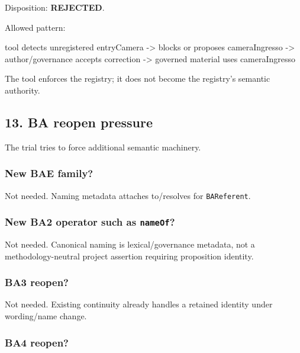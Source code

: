 \documentclass[
  10pt,
  a4paper,
]{article}
\newenvironment{Shaded}{}{}
\newcommand{\NormalTok}[1]{#1}
\begin{document}
Disposition: \textbf{REJECTED}.

Allowed pattern:

\begin{Shaded}
\begin{Highlighting}[]
\NormalTok{tool detects unregistered entryCamera}
\NormalTok{  {-}\textgreater{} blocks or proposes cameraIngresso}
\NormalTok{  {-}\textgreater{} author/governance accepts correction}
\NormalTok{  {-}\textgreater{} governed material uses cameraIngresso}
\end{Highlighting}
\end{Shaded}

The tool enforces the registry; it does not become the registry's
semantic authority.

\subsection{13. BA reopen pressure}\label{ba-reopen-pressure}

The trial tries to force additional semantic machinery.

\subsubsection{New BAE family?}\label{new-bae-family}

Not needed. Naming metadata attaches to/resolves for
\texttt{BAReferent}.

\subsubsection{\texorpdfstring{New BA2 operator such as
\texttt{nameOf}?}{New BA2 operator such as nameOf?}}\label{new-ba2-operator-such-as-nameof}

Not needed. Canonical naming is lexical/governance metadata, not a
methodology-neutral project assertion requiring proposition identity.

\subsubsection{BA3 reopen?}\label{ba3-reopen}

Not needed. Existing continuity already handles a retained identity
under wording/name change.

\subsubsection{BA4 reopen?}\label{ba4-reopen}
\end{document}
